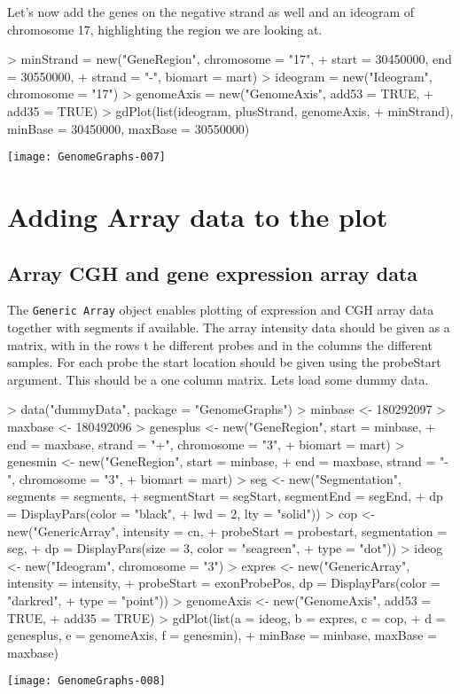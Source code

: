 \documentclass[11pt]{article}
\newcommand{\Robject}[1]{{\texttt{#1}}}
\begin{document}
Let's now add the genes on the negative strand as well and an ideogram
of chromosome 17, highlighting the region we are looking at.


\begin{Schunk}
\begin{Sinput}
> minStrand = new("GeneRegion", chromosome = "17", 
+     start = 30450000, end = 30550000, 
+     strand = "-", biomart = mart)
> ideogram = new("Ideogram", chromosome = "17")
> genomeAxis = new("GenomeAxis", add53 = TRUE, 
+     add35 = TRUE)
> gdPlot(list(ideogram, plusStrand, genomeAxis, 
+     minStrand), minBase = 30450000, maxBase = 30550000)
\end{Sinput}
\end{Schunk}
\texttt{[image: GenomeGraphs-007]}

\section{Adding Array data to the plot}

\subsection{Array CGH and gene expression array data}
The \Robject{Generic Array} object enables plotting of expression and
CGH array data together with segments if available.  The array
intensity data should be given as a matrix, with in the rows t he
different probes and in the columns the different samples.  For each
probe the start location should be given using the probeStart
argument.  This should be a one column matrix.  Lets load some dummy
data.

\begin{Schunk}
\begin{Sinput}
> data("dummyData", package = "GenomeGraphs")
> minbase <- 180292097
> maxbase <- 180492096
> genesplus <- new("GeneRegion", start = minbase, 
+     end = maxbase, strand = "+", chromosome = "3", 
+     biomart = mart)
> genesmin <- new("GeneRegion", start = minbase, 
+     end = maxbase, strand = "-", chromosome = "3", 
+     biomart = mart)
> seg <- new("Segmentation", segments = segments, 
+     segmentStart = segStart, segmentEnd = segEnd, 
+     dp = DisplayPars(color = "black", 
+         lwd = 2, lty = "solid"))
> cop <- new("GenericArray", intensity = cn, 
+     probeStart = probestart, segmentation = seg, 
+     dp = DisplayPars(size = 3, color = "seagreen", 
+         type = "dot"))
> ideog <- new("Ideogram", chromosome = "3")
> expres <- new("GenericArray", intensity = intensity, 
+     probeStart = exonProbePos, dp = DisplayPars(color = "darkred", 
+         type = "point"))
> genomeAxis <- new("GenomeAxis", add53 = TRUE, 
+     add35 = TRUE)
> gdPlot(list(a = ideog, b = expres, c = cop, 
+     d = genesplus, e = genomeAxis, f = genesmin), 
+     minBase = minbase, maxBase = maxbase)
\end{Sinput}
\end{Schunk}
\texttt{[image: GenomeGraphs-008]}
\end{document}
